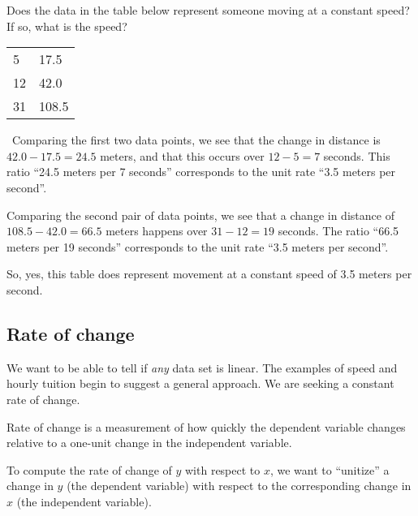 \begin{boxex}
Does the data in the table below represent someone moving at a constant speed? If so, what is the speed?

\begin{center}
\begin{tabular}{|C{2cm}|C{2cm}|}
\hline
{} & \\ & 17.5\\
12 & 42.0\\
31 & 108.5\\\hline
\end{tabular}
\end{center}

\exsoln\ Comparing the first two data points, we see that the change in distance is $42.0 - 17.5 = 24.5$ meters, and that this occurs over $12-5=7$ seconds. This ratio ``24.5 meters per 7 seconds'' corresponds to the unit rate ``3.5 meters per second''.

Comparing the second pair of data points, we see that a change in distance of $108.5-42.0 = 66.5$ meters happens over $31-12 = 19$ seconds. The ratio ``66.5 meters per 19 seconds'' corresponds to the unit rate ``3.5 meters per second''.

So, yes, this table does represent movement at a constant speed of 3.5 meters per second.
\end{boxex}


\subsection{Rate of change}

We want to be able to tell if \textit{any} data set is linear. The examples of speed and hourly tuition begin to suggest a general approach. We are seeking a constant \gls{rate of change}.

\begin{boxdef}
Rate of change is a measurement of how quickly the dependent variable changes relative to a one-unit change in the independent variable.
\end{boxdef}

To compute the rate of change of $y$ with respect to $x$, we want to ``unitize'' a change in $y$ (the dependent variable) with respect to the corresponding change in $x$ (the independent variable).

